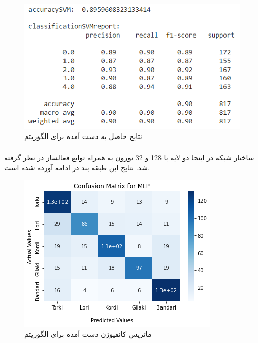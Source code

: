 \begin{figure}[h!]
	\centering
	\includegraphics[width=1\linewidth]{images/svm_classification_results_augment.PNG}
	\caption{نتایج حاصل به دست آمده برای الگوریتم }
	\label{fig:svm_classification_results_augment}
\end{figure}

\subsubsection{}
ساختار شبکه در اینجا دو لایه با 128 و 32 نورون به همراه توابع فعالساز  در نظر گرفته شد.
نتایج این طبقه بند در ادامه آورده شده است.

\begin{figure}[h!]
	\centering
	\includegraphics[width=1\linewidth]{images/mlp_cm_augment.png}
	\caption{ماتریس کانفیوژن دست آمده برای الگوریتم }
	\label{fig:mlp_cm_augment}
\end{figure}

